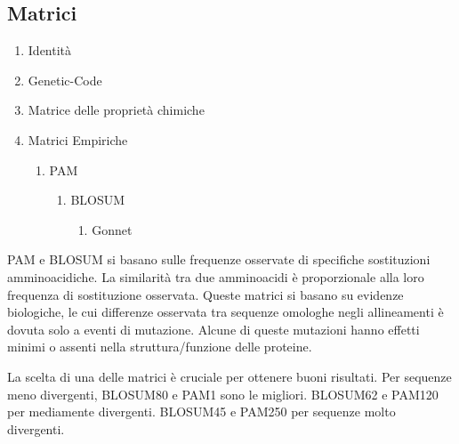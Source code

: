 \documentclass[11pt]{article}
\begin{document}
\subsection{Matrici}
\label{sec:org3e29e39}
\begin{enumerate}
\item Identità
\item Genetic-Code
\item Matrice delle proprietà chimiche
\item Matrici Empiriche
\begin{enumerate}
\item PAM
\begin{enumerate}
\item BLOSUM
\begin{enumerate}
\item Gonnet
\end{enumerate}
\end{enumerate}
\end{enumerate}
\end{enumerate}
PAM e BLOSUM si basano sulle frequenze osservate di specifiche sostituzioni amminoacidiche. La similarità tra due amminoacidi è proporzionale alla loro frequenza di sostituzione osservata.
Queste matrici si basano su evidenze biologiche, le cui differenze osservata tra sequenze omologhe negli allineamenti è dovuta solo a eventi di mutazione. Alcune di queste mutazioni hanno effetti minimi o assenti nella struttura/funzione delle proteine.

La scelta di una delle matrici è cruciale per ottenere buoni risultati.
Per sequenze meno divergenti, BLOSUM80 e PAM1 sono le migliori. BLOSUM62 e PAM120 per mediamente divergenti. BLOSUM45 e PAM250 per sequenze molto divergenti.
\end{document}
